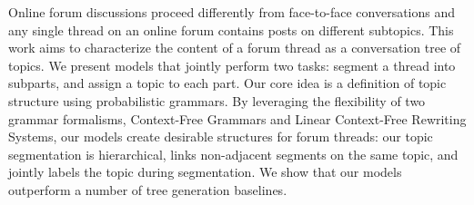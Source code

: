 Online forum discussions proceed differently from face-to-face conversations and any single thread on an online forum contains posts on different subtopics. This work aims to characterize the content of a forum thread as a conversation tree of topics. We present models that jointly perform two tasks: segment a thread into subparts, and assign a topic to each part. Our core idea is a definition of topic structure using probabilistic grammars. By leveraging the flexibility of two grammar formalisms, Context-Free Grammars and Linear Context-Free Rewriting Systems, our models create desirable structures for forum threads: our topic segmentation is hierarchical, links non-adjacent segments on the same topic, and jointly labels the topic during segmentation. We show that our models outperform a number of tree generation baselines.
